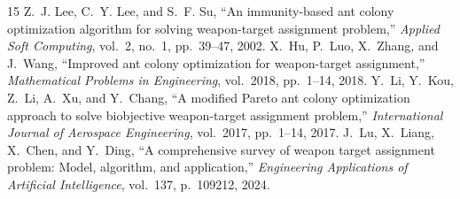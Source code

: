 \documentclass[10pt,conference]{IEEEtran}
\begin{document}
\begin{thebibliography}{15}
 Z.~J. Lee, C.~Y. Lee, and S.~F. Su, ``An immunity-based ant colony optimization algorithm for solving weapon-target assignment problem,'' \textit{Applied Soft Computing}, vol.~2, no.~1, pp.~39--47, 2002.
 X.~Hu, P.~Luo, X.~Zhang, and J.~Wang, ``Improved ant colony optimization for weapon-target assignment,'' \textit{Mathematical Problems in Engineering}, vol.~2018, pp.~1--14, 2018.
 Y.~Li, Y.~Kou, Z.~Li, A.~Xu, and Y.~Chang, ``A modified Pareto ant colony optimization approach to solve biobjective weapon-target assignment problem,'' \textit{International Journal of Aerospace Engineering}, vol.~2017, pp.~1--14, 2017.
 J.~Lu, X.~Liang, X.~Chen, and Y.~Ding, ``A comprehensive survey of weapon target assignment problem: Model, algorithm, and application,'' \textit{Engineering Applications of Artificial Intelligence}, vol.~137, p.~109212, 2024.
\end{thebibliography}
\end{document}
